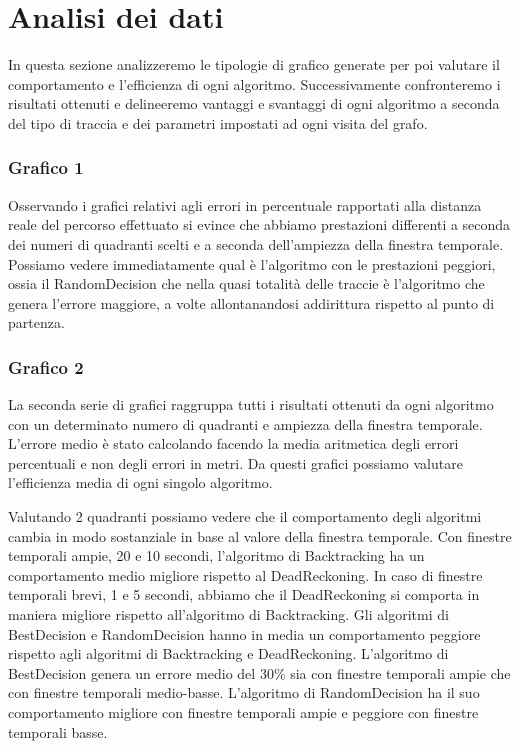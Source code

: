 \documentclass[12pt,a4paper,openright,twoside]{report}
\begin{document}
\section{Analisi dei dati}
In questa sezione analizzeremo le tipologie di grafico generate per poi valutare il comportamento e l'efficienza di ogni algoritmo. Successivamente confronteremo i risultati ottenuti e delineeremo vantaggi e svantaggi di ogni algoritmo a seconda del tipo di traccia e dei parametri impostati ad ogni visita del grafo.

\subsubsection{Grafico 1}
Osservando i grafici relativi agli errori in percentuale rapportati alla distanza reale del percorso effettuato si evince che abbiamo prestazioni differenti a seconda dei numeri di quadranti scelti e a seconda dell'ampiezza della finestra temporale.
Possiamo vedere immediatamente qual è l'algoritmo con le prestazioni peggiori, ossia il RandomDecision che nella quasi totalità delle traccie è l'algoritmo che genera l'errore maggiore, a volte allontanandosi addirittura rispetto al punto di partenza.

\subsubsection{Grafico 2}
La seconda serie di grafici raggruppa tutti i risultati ottenuti da ogni algoritmo con un determinato numero di quadranti e ampiezza della finestra temporale. L'errore medio è stato calcolando facendo la media aritmetica degli errori percentuali e non degli errori in metri.
Da questi grafici possiamo valutare l'efficienza media di ogni singolo algoritmo.

Valutando 2 quadranti possiamo vedere che il comportamento degli algoritmi cambia in modo sostanziale in base al valore della finestra temporale. Con finestre temporali ampie, 20 e 10 secondi, l'algoritmo di Backtracking ha un comportamento medio migliore rispetto al DeadReckoning. In caso di finestre temporali brevi, 1 e 5 secondi, abbiamo che il DeadReckoning si comporta in maniera migliore rispetto all'algoritmo di Backtracking.
Gli algoritmi di BestDecision e RandomDecision hanno in media un comportamento peggiore rispetto agli algoritmi di Backtracking e DeadReckoning. L'algoritmo di BestDecision genera un errore medio del 30\% sia con finestre temporali ampie che con finestre temporali medio-basse. L'algoritmo di RandomDecision ha il suo comportamento migliore con finestre temporali ampie e peggiore con finestre temporali basse.
\end{document}
